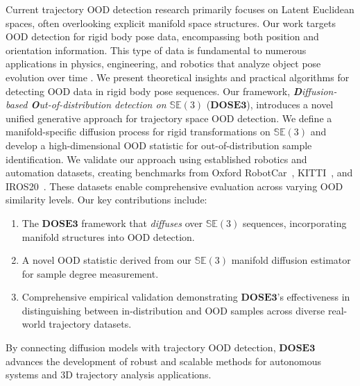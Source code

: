 Current trajectory \ac{OOD} detection research primarily focuses on Latent Euclidean spaces, often overlooking explicit manifold space structures. Our work targets OOD detection for rigid body pose data, encompassing both position and orientation information. This type of data is fundamental to numerous applications in physics, engineering, and robotics that analyze object pose evolution over time \citep{unifying, darkgs}. We present theoretical insights and practical algorithms for detecting OOD data in rigid body pose sequences. Our framework, \emph{\textbf{D}iffusion-based \textbf{O}ut-of-distribution detection on $\mathbb{SE}(3)$} ($\mathbf{DOSE3}$), introduces a novel unified generative approach for trajectory space OOD detection. We define a manifold-specific diffusion process for rigid transformations on $\mathbb{SE}(3)$ and develop a high-dimensional OOD statistic for out-of-distribution sample identification.
We validate our approach using established robotics and automation datasets, creating benchmarks from Oxford RobotCar~\citep{RobotCarDatasetIJRR}, KITTI~\citep{Geiger2012CVPR}, and IROS20~\citep{wen2020se}. These datasets enable comprehensive evaluation across varying OOD similarity levels. Our key contributions include:
\begin{enumerate}
\item The $\mathbf{DOSE3}$ framework that \emph{diffuses} over $\mathbb{SE}(3)$ sequences, incorporating manifold structures into OOD detection.
\item A novel OOD statistic derived from our $\mathbb{SE}(3)$ manifold diffusion estimator for sample degree measurement.
\item Comprehensive empirical validation demonstrating $\mathbf{DOSE3}$'s effectiveness in distinguishing between in-distribution and OOD samples across diverse real-world trajectory datasets.
\end{enumerate}
By connecting diffusion models with trajectory OOD detection, $\mathbf{DOSE3}$ advances the development of robust and scalable methods for autonomous systems and 3D trajectory analysis applications.